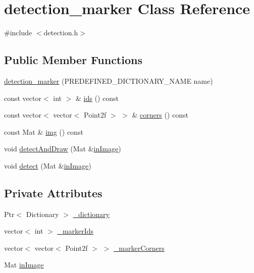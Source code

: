 \hypertarget{classdetection__marker}{\section{detection\+\_\+marker Class Reference}
\label{classdetection__marker}
}


{\ttfamily \#include $<$detection.\+h$>$}

\subsection*{Public Member Functions}
\begin{DoxyCompactItemize}
\item 
\hyperlink{classdetection__marker_a78703d9cfece4550684a3f6e0dfd659b}{detection\+\_\+marker} (P\+R\+E\+D\+E\+F\+I\+N\+E\+D\+\_\+\+D\+I\+C\+T\+I\+O\+N\+A\+R\+Y\+\_\+\+N\+A\+M\+E name)
\item 
const vector$<$ int $>$ \& \hyperlink{classdetection__marker_a486d89e7f7008d87a1c3c26c89ad3b74}{ids} () const 
\item 
const vector$<$ vector$<$ Point2f $>$ $>$ \& \hyperlink{classdetection__marker_a243c4a54a4b9d9c084672660e5d47f39}{corners} () const 
\item 
const Mat \& \hyperlink{classdetection__marker_a770b0b3075bf960621006f7f939b9757}{img} () const 
\item 
void \hyperlink{classdetection__marker_a08cd89907df009bce97bb5a6561074e6}{detect\+And\+Draw} (Mat \&\hyperlink{classdetection__marker_a38b3944516f9a3ae26d23ed9a8b5ce52}{in\+Image})
\item 
void \hyperlink{classdetection__marker_a4149fb9467f5cc15b1086c548821d925}{detect} (Mat \&\hyperlink{classdetection__marker_a38b3944516f9a3ae26d23ed9a8b5ce52}{in\+Image})
\end{DoxyCompactItemize}
\subsection*{Private Attributes}
\begin{DoxyCompactItemize}
\item 
Ptr$<$ Dictionary $>$ \hyperlink{classdetection__marker_a2cc4c5ea62ab82cd0d6f2b744bb57611}{\+\_\+dictionary}
\item 
vector$<$ int $>$ \hyperlink{classdetection__marker_ae0518eaa5762d3cf2d6570cb3440bd91}{\+\_\+marker\+Ids}
\item 
vector$<$ vector$<$ Point2f $>$ $>$ \hyperlink{classdetection__marker_a32435b120f01d7a7ed4d0e6e926aa5c9}{\+\_\+marker\+Corners}
\item 
Mat \hyperlink{classdetection__marker_a38b3944516f9a3ae26d23ed9a8b5ce52}{in\+Image}
\end{DoxyCompactItemize}


